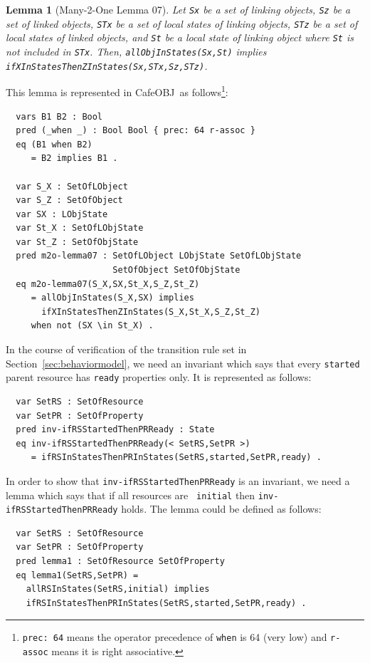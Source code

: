 \documentclass[12pt]{report}
\newtheorem{lemma}{Lemma}
\newcommand{\stt}[1]{{\small{\tt {#1}}}}
\newcommand{\cafeobj}{{\sf CafeOBJ}~}
\begin{document}
\begin{lemma}[Many-2-One Lemma 07]
  Let {\tt Sx} be a set of linking objects, {\tt Sz} be a set of
  linked objects, {\tt STx} be a set of local states of linking
  objects, {\tt STz} be a set of local states of linked objects, and
  {\tt St} be a local state of linking object where {\tt St} is not
  included in {\tt STx}. Then, \stt{allObjInStates(Sx,St)} implies
  \stt{ifXInStatesThenZInStates(Sx,STx,Sz,STz)}.
\end{lemma}
This lemma is represented in \cafeobj as follows\footnote{\stt{prec:~64} 
means the operator precedence of {\tt when} is 64 (very low) and 
{\tt r-assoc} means it is right associative.}:
\small
\begin{verbatim}
  vars B1 B2 : Bool
  pred (_when _) : Bool Bool { prec: 64 r-assoc }
  eq (B1 when B2)
     = B2 implies B1 .

  var S_X : SetOfLObject
  var S_Z : SetOfObject
  var SX : LObjState
  var St_X : SetOfLObjState
  var St_Z : SetOfObjState
  pred m2o-lemma07 : SetOfLObject LObjState SetOfLObjState 
                     SetOfObject SetOfObjState
  eq m2o-lemma07(S_X,SX,St_X,S_Z,St_Z)
     = allObjInStates(S_X,SX) implies 
       ifXInStatesThenZInStates(S_X,St_X,S_Z,St_Z)
     when not (SX \in St_X) .
\end{verbatim}
\normalsize
In the course of verification of the transition rule set in
Section~\ref{sec:behaviormodel}, we need an invariant which says that
every {\tt started} parent resource has {\tt ready} properties
only. It is represented as follows:
\small
\begin{verbatim}
  var SetRS : SetOfResource
  var SetPR : SetOfProperty
  pred inv-ifRSStartedThenPRReady : State
  eq inv-ifRSStartedThenPRReady(< SetRS,SetPR >)
     = ifRSInStatesThenPRInStates(SetRS,started,SetPR,ready) .
\end{verbatim}
\normalsize
In order to show that {\tt inv-ifRSStartedThenPRReady} is an
invariant, we need a lemma which says that if all resources are {\tt
  initial} then {\tt inv-ifRSStartedThenPRReady} holds.  The lemma
could be defined as follows:
\small
\begin{verbatim}
  var SetRS : SetOfResource
  var SetPR : SetOfProperty
  pred lemma1 : SetOfResource SetOfProperty
  eq lemma1(SetRS,SetPR) =
    allRSInStates(SetRS,initial) implies
    ifRSInStatesThenPRInStates(SetRS,started,SetPR,ready) .
\end{verbatim}
\end{document}
